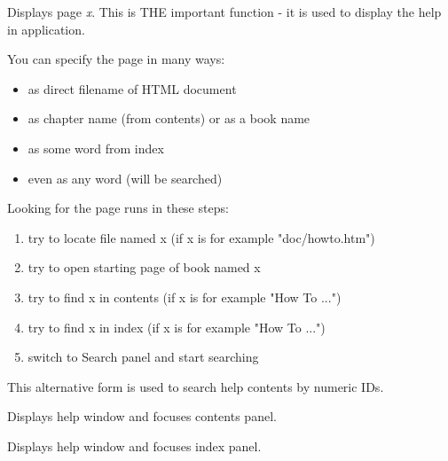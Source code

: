 \label{wxhtmlhelpcontrollerdisplay}


Displays page {\it x}. This is THE important function - it is used to display
the help in application.

You can specify the page in many ways:

\begin{itemize}\itemsep=0pt
\item as direct filename of HTML document
\item as chapter name (from contents) or as a book name
\item as some word from index
\item even as any word (will be searched)
\end{itemize}

Looking for the page runs in these steps:

\begin{enumerate}\itemsep=0pt
\item try to locate file named x (if x is for example "doc/howto.htm")
\item try to open starting page of book named x
\item try to find x in contents (if x is for example "How To ...")
\item try to find x in index (if x is for example "How To ...")
\item switch to Search panel and start searching
\end{enumerate}


This alternative form is used to search help contents by numeric IDs.


\label{wxhtmlhelpcontrollerdisplaycontents}


Displays help window and focuses contents panel.

\label{wxhtmlhelpcontrollerdisplayindex}


Displays help window and focuses index panel.

\label{wxhtmlhelpcontrollerkeywordsearch}

